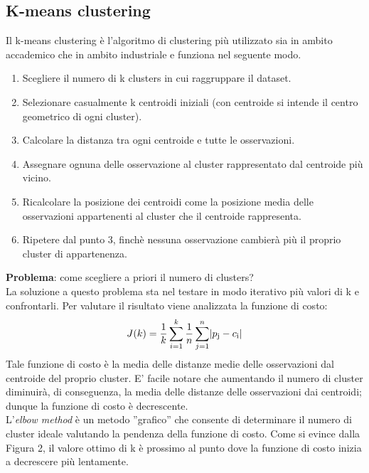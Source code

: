 \documentclass[10pt,a4paper]{article}
\DeclarePairedDelimiter\abs{\lvert}{\rvert}
\begin{document}
        		\subsection{K-means clustering}
        		Il k-means clustering è l'algoritmo di clustering più utilizzato sia in ambito accademico che in ambito industriale e funziona nel seguente modo.
        		\begin{enumerate}
        		\item Scegliere il numero di k clusters in cui raggruppare il dataset.
        		\item Selezionare casualmente k centroidi iniziali (con centroide si intende il centro geometrico di ogni cluster).
        		\item Calcolare la distanza tra ogni centroide e tutte le osservazioni.
        		\item Assegnare ognuna delle osservazione al cluster rappresentato dal centroide più vicino.
        		\item Ricalcolare la posizione dei centroidi come la posizione media delle osservazioni appartenenti al cluster che il centroide rappresenta.
        		\item Ripetere dal punto 3, finchè nessuna osservazione cambierà più il proprio cluster di appartenenza.
        		\end{enumerate}
		\textbf{Problema}: come scegliere a priori il numero di clusters?\\
		La soluzione a questo problema sta nel testare in modo iterativo più valori di k e confrontarli. 
		Per valutare il risultato viene analizzata la funzione di costo:
		\[
		J(k)=\frac{1}{k}
		\sum_{i=1}^k
		\frac{1}{n}
		\sum_{j=1}^n
		\abs{p\textsubscript{j}-c\textsubscript{i}}
		\]
		Tale funzione di costo è la media delle distanze medie delle osservazioni dal centroide del proprio cluster. E' facile notare che aumentando il numero di
		cluster diminuirà, di conseguenza, la media delle distanze delle osservazioni dai centroidi; dunque la funzione di costo è decrescente.\\
		L'\textit{elbow method} è un metodo ''grafico'' che consente di determinare il numero di cluster ideale valutando la pendenza della funzione di costo.
		Come si evince dalla Figura 2, il valore ottimo di k è prossimo al punto dove la funzione di costo inizia a decrescere più lentamente.
\end{document}
